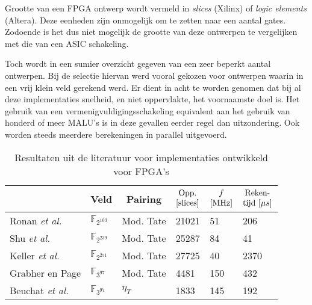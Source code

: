Grootte van een FPGA ontwerp wordt vermeld in \emph{slices} (Xilinx) of \emph{logic elements} (Altera). Deze eenheden zijn onmogelijk om te zetten naar een aantal gates. Zodoende is het dus niet mogelijk de grootte van deze ontwerpen te vergelijken met die van een ASIC schakeling.

Toch wordt in  een sumier overzicht gegeven van een zeer beperkt aantal ontwerpen. Bij de selectie hiervan werd vooral gekozen voor ontwerpen waarin in een vrij klein veld gerekend werd. Er dient in acht te worden genomen dat bij al deze implementaties snelheid, en niet oppervlakte, het voornaamste doel is. Het gebruik van een vermenigvuldigingsschakeling equivalent aan het gebruik van honderd of meer MALU's is in deze gevallen eerder regel dan uitzondering. Ook worden steeds meerdere berekeningen in parallel uitgevoerd.

\begin{table}[h]
	\caption{Resultaten uit de literatuur voor implementaties ontwikkeld voor FPGA's}
	\label{tabel-resultaten-fpga}

	\centering
	\begin{tabular}{llllll}
		\toprule
		&	\multicolumn{1}{c}{Veld}	& \multicolumn{1}{c}{Pairing}	& $\begin{array}{@{}c@{}}\text{Opp.}\\\text{[slices]}\end{array}$	& $\begin{array}{@{}c@{}}f\\\text{[MHz]}\end{array}$	& $\begin{array}{@{}c@{}}\text{Reken-}\\\text{tijd }[\mu s]\end{array}$\\
		\midrule
		Ronan \emph{et al.} \cite{ronan}				& $\mathbb{F}_{2^{103}}$	& Mod. Tate	& 21021	& 51	& 206\\
		Shu \emph{et al.} \cite{shu}					& $\mathbb{F}_{2^{239}}$	& Mod. Tate	& 25287	& 84	& 41\\
		Keller \emph{et al.} \cite{keller}			& $\mathbb{F}_{2^{251}}$	& Mod. Tate	& 27725	& 40	& 2370\\
		Grabher en Page \cite{grabher}				& $\mathbb{F}_{3^{97}}$		& Mod. Tate	& 4481	& 150	& 432\\
		Beuchat \emph{et al.} \cite{beuchat-eta}	& $\mathbb{F}_{3^{97}}$		& $\eta_T$	& 1833	& 145	& 192\\
		\bottomrule
	\end{tabular}
\end{table}

